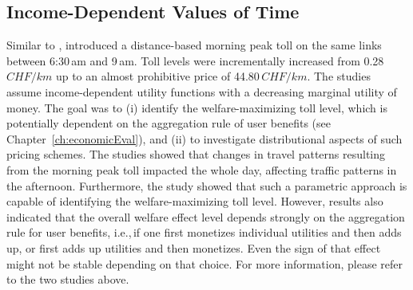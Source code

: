 \subsection{Income-Dependent Values of Time}
Similar to \citet{RieserEtAl_TRBTDF_2008}, \citet{KickhoeferEtAl2010EconomicEvaluationPublicAcceptanceRoadPricingKuhmo, Kickhoefer_PhDThesis_2014} introduced a distance-based morning peak toll on the same links between 6:30\,am and 9\,am. Toll levels were incrementally increased from 0.28\,$CHF/km$ up to an almost prohibitive price of 44.80\,$CHF/km$. The studies assume income-dependent utility functions with a decreasing marginal utility of money. The goal was to (i) identify the welfare-maximizing \citep[see e.g.,][Section~2.5]{TirachiniEtAl2012CrowdingCongestion}
toll level, which is potentially dependent on the aggregation rule of user benefits (see Chapter~\ref{ch:economicEval}), and (ii) to investigate distributional aspects of such pricing schemes.
%
The studies showed that changes in travel patterns resulting from the morning peak toll impacted the whole day, affecting traffic patterns in the afternoon.
%
Furthermore, the study showed that such a parametric approach is capable of identifying the welfare-maximizing toll level. However, results also indicated that the overall welfare effect level depends strongly on the aggregation rule for user benefits, i.e.,\,if one first monetizes individual utilities and then adds up, or first adds up utilities and then monetizes. 
Even the sign of that effect might not be stable depending on that choice.
%
For more information, please refer to the two studies above.


